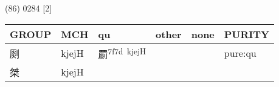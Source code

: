 \documentclass[14pt,a4paper]{scrartcl}
\begin{document}
(86) 0284 {[}2{]}

\begin{longtable}[c]{@{}llllll@{}}
\toprule
\begin{minipage}[b]{0.14\columnwidth}\raggedright\strut
GROUP
\strut\end{minipage} &
\begin{minipage}[b]{0.14\columnwidth}\raggedright\strut
MCH
\strut\end{minipage} &
\begin{minipage}[b]{0.14\columnwidth}\raggedright\strut
qu
\strut\end{minipage} &
\begin{minipage}[b]{0.14\columnwidth}\raggedright\strut
other
\strut\end{minipage} &
\begin{minipage}[b]{0.14\columnwidth}\raggedright\strut
none
\strut\end{minipage} &
\begin{minipage}[b]{0.14\columnwidth}\raggedright\strut
PURITY
\strut\end{minipage}\tabularnewline
\midrule
\endhead
\begin{minipage}[t]{0.14\columnwidth}\raggedright\strut
㓹
\strut\end{minipage} &
\begin{minipage}[t]{0.14\columnwidth}\raggedright\strut
kjejH
\strut\end{minipage} &
\begin{minipage}[t]{0.14\columnwidth}\raggedright\strut
罽\textsuperscript{7f7d~kjejH}
\strut\end{minipage} &
\begin{minipage}[t]{0.14\columnwidth}\raggedright\strut
\strut\end{minipage} &
\begin{minipage}[t]{0.14\columnwidth}\raggedright\strut
\strut\end{minipage} &
\begin{minipage}[t]{0.14\columnwidth}\raggedright\strut
pure:qu
\strut\end{minipage}\tabularnewline
\begin{minipage}[t]{0.14\columnwidth}\raggedright\strut
桀
\strut\end{minipage} &
\begin{minipage}[t]{0.14\columnwidth}\raggedright\strut
kjejH
\strut\end{minipage} &
\begin{minipage}[t]{0.14\columnwidth}\raggedright\strut
\strut\end{minipage} &

\end{longtable}
\end{document}
